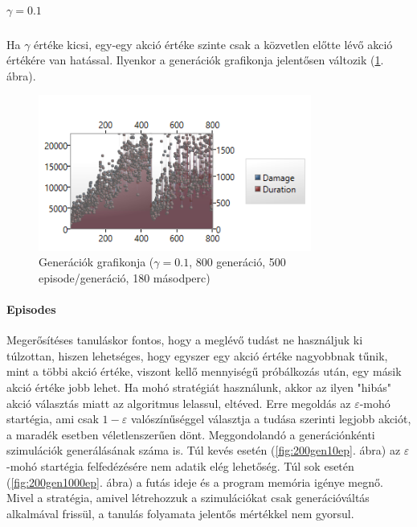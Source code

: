 \documentclass[12pt]{article}
\begin{document}
	\subparagraph{$\gamma = 0.1$}
	
	Ha $\gamma$ értéke kicsi, egy-egy akció értéke szinte csak a közvetlen előtte lévő akció értékére van hatással. Ilyenkor a generációk grafikonja jelentősen változik (\ref{fig:01gamma800gen500ep1800dur}. ábra). 
	
	\begin{figure}[H]
		\begin{center}
			\includegraphics[width=0.8\textwidth]{01gamma800gen500ep1800dur}
		\end{center}
		\caption{Generációk grafikonja ($\gamma = 0.1$, 800 generáció, 500 episode/generáció, 180 másodperc)}
		\label{fig:01gamma800gen500ep1800dur}
	\end{figure}
	
	\paragraph{Episodes}
	
	Megerősítéses tanuláskor fontos, hogy a meglévő tudást ne használjuk ki túlzottan, hiszen lehetséges, hogy egyszer egy akció értéke nagyobbnak tűnik, mint a többi akció értéke, viszont kellő mennyiségű próbálkozás után, egy másik akció értéke jobb lehet. Ha mohó stratégiát használunk, akkor az ilyen "hibás" akció választás miatt az algoritmus lelassul, eltéved. Erre megoldás az $\varepsilon$-mohó startégia, ami csak $1-\varepsilon$ valószínűséggel választja a tudása szerinti legjobb akciót, a maradék esetben véletlenszerűen dönt.
	Meggondolandó a generációnkénti szimulációk generálásának száma is. Túl kevés esetén (\ref{fig:200gen10ep}. ábra) az $\varepsilon$-mohó startégia felfedézésére nem adatik elég lehetőség. Túl sok esetén (\ref{fig:200gen1000ep}. ábra) a futás ideje és a program memória igénye megnő. Mivel a stratégia, amivel létrehozzuk a szimulációkat csak generációváltás alkalmával frissül, a tanulás folyamata jelentős mértékkel nem gyorsul. 
	
\end{document}
